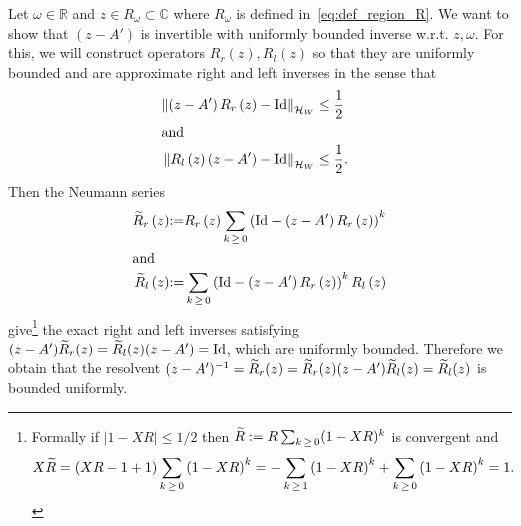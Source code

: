 \documentclass[10pt]{amsart}
\theoremstyle{definition}\newtheorem{defi}[theo]{Definition}\newtheorem{rema}[theo]{Remark}\newtheorem{exam}[theo]{Example}\newtheorem{exem}[theo]{Example}\newtheorem{nota}[theo]{Notation}
\newcommand{\clH}{\mathcal{H}}
\newcommand{\Id}{\mathrm{Id}}
\newcommand{\bbR}{\mathbb{R}}
\newcommand{\bbC}{\mathbb{C}}
\let\oldtilde\tilde
\renewcommand*{\tilde}[1]{\mathchoice{\widetilde{#1}}{\widetilde{#1}}{\oldtilde{#1}}{\oldtilde{#1}}}
\begin{document}
Let $\omega\in\bbR$ and $z\in R_{\omega}\subset\bbC$ where $R_{\omega}$ is defined in~\eqref{eq:def_region_R}. We want to show that $(z-A')$ is invertible with uniformly bounded inverse w.r.t. $z,\omega$. For this, we will construct operators $R_{r}(z),R_{l}(z)$ so that they are uniformly bounded and are approximate right and left inverses in the sense that
\begin{align}
\left\Vert \left(z-A'\right)R_{r}\left(z\right)-\Id \right\Vert _{\clH _{W}} & \leq\frac{1}{2}\quad\label{eq:almost_inverse}\\
\intertext{and}
\left\Vert R_{l}\left(z\right)\left(z-A'\right)-\Id \right\Vert _{\clH _{W}} & \leq\frac{1}{2}.
\end{align}
Then the Neumann series
\begin{align*}
\tilde{R}_{r}\left(z\right) &{:=}  R_{r}\left(z\right)\sum_{k\,\geq\,0}\left(\Id -\left(z-A'\right)R_{r}\left(z\right)\right)^{k}\\
\intertext{and}
\tilde{R}_{l}\left(z\right) &{:=}  \sum_{k\,\geq\,0}\left(\Id -\left(z-A'\right)R_{r}\left(z\right)\right)^{k}R_{l}\left(z\right)
\end{align*}
give\footnote{Formally if $|1-XR|\leq1/2$ then $\tilde{R}:=R\sum_{k\,\geq\,0}(1-XR)^{k}$ is convergent and
\[
X\tilde{R}=\left(XR-1+1\right)\sum_{k\,\geq\,0}\left(1-XR\right)^{k}=-\sum_{k\,\geq\,1}\left(1-XR\right)^{k}+\sum_{k\,\geq\,0}\left(1-XR\right)^{k}=1.
\]}
the exact right and left inverses satisfying $(z-A')\tilde{R}_{r}(z)=\tilde{R}_{l}(z)(z-A')=\Id $, which are uniformly bounded. Therefore we obtain that the resolvent $(z-A')^{-1}=\tilde{R}_{r}(z)=\tilde{R}_{r}(z)(z-A')\tilde{R}_{l}(z)=\tilde{R}_{l}(z)$ is bounded uniformly.
\end{document}
